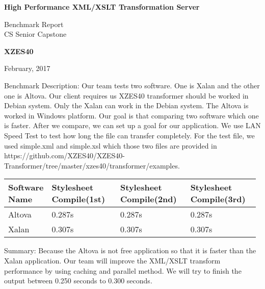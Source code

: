 \documentclass[letterpaper,10pt,titlepage]{article}
\begin{document}
\begin{titlepage}
    \begin{center}
        \vspace*{1cm}
        \Huge
        \textbf{High Performance XML/XSLT Transformation Server}
        \vspace{0.5cm}
        
        \LARGE
        Benchmark Report \\
        \vspace{1cm}
        CS Senior Capstone \\
        \vspace{1.5cm}

        \textbf{XZES40}
        \date{February, 2017}
        \vfill
        February, 2017
    \end{center}
\end{titlepage}

Benchmark Description:
Our team tests two software. One is Xalan and the other one is Altova. Our client
requires us XZES40 transformer should be worked in Debian system. Only the Xalan
can work in the Debian system. The Altova is worked in Windows platform. Our goal
is that comparing two software which one is faster. After we compare, we can set up a
goal for our application. We use LAN Speed Test to test how long the file can transfer
completely. For the test file, we used simple.xml and simple.xsl which those two files 
are provided in https://github.com/XZES40/XZES40-Transformer/tree/master/xzes40/transformer/examples.

\begin{longtable}{ | p{0.075\linewidth} | p{0.3\linewidth} | p{0.3\linewidth} | p{0.3\linewidth} |} \hline
  Software Name & Stylesheet Compile(1st) & Stylesheet Compile(2nd) & Stylesheet Compile(3rd) \\ \hline
  	Altova &
    0.287s &
    0.287s &
    0.287s \\
  \hline
  	Xalan &
    0.307s &
    0.307s &
    0.307s\\
  \hline
\end{longtable}

Summary:
Because the Altova is not free application so that it is faster than the Xalan application.
Our team will improve the XML/XSLT transform performance by using caching and
parallel method. We will try to finish the output between 0.250 seconds to 0.300 seconds.


\newpage
\end{document}

